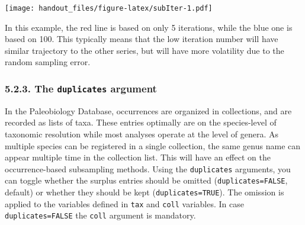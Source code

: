\documentclass[]{article}
\begin{document}
\texttt{[image: handout\_files/figure-latex/subIter-1.pdf]}

In this example, the red line is based on only 5 iterations, while the
blue one is based on 100. This typically means that the low iteration
number will have similar trajectory to the other series, but will have
more volatility due to the random sampling error.

\hypertarget{the-duplicates-argument}{%
\subsubsection{\texorpdfstring{5.2.3. The \texttt{duplicates}
argument}{5.2.3. The duplicates argument}}\label{the-duplicates-argument}}

In the Paleobiology Database, occurrences are organized in collections,
and are recorded as lists of taxa. These entries optimally are on the
species-level of taxonomic resolution while most analyses operate at the
level of genera. As multiple species can be registered in a single
collection, the same genus name can appear multiple time in the
collection list. This will have an effect on the occurrence-based
subsampling methods. Using the \texttt{duplicates} arguments, you can
toggle whether the surplus entries should be omitted
(\texttt{duplicates=FALSE}, default) or whether they should be kept
(\texttt{duplicates=TRUE}). The omission is applied to the variables
defined in \texttt{tax} and \texttt{coll} variables. In case
\texttt{duplicates=FALSE} the \texttt{coll} argument is mandatory.
\end{document}
